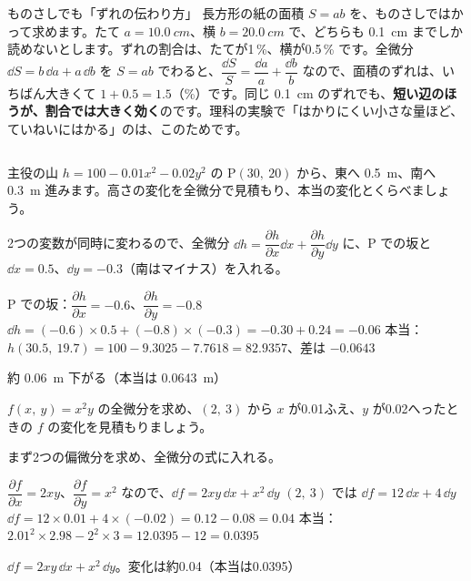 
\begin{column}{ものさしでも「ずれの伝わり方」}
長方形の紙の面積 $S=ab$ を、ものさしではかって求めます。たて $a=\qty{10.0}{cm}$、横 $b=\qty{20.0}{cm}$ で、どちらも \qty{0.1}{cm} までしか読めないとします。ずれの割合は、たてが1\,\%、横が0.5\,\% です。全微分 $\dd S=b\,\dd a+a\,\dd b$ を $S=ab$ でわると、$\dfrac{\dd S}{S}=\dfrac{\dd a}{a}+\dfrac{\dd b}{b}$ なので、面積のずれは、いちばん大きくて $1+0.5=1.5$（\%）です。同じ \qty{0.1}{cm} のずれでも、\textbf{短い辺のほうが、割合では大きく効く}のです。理科の実験で「はかりにくい小さな量ほど、ていねいにはかる」のは、このためです。
\end{column}


\begin{reidai}
主役の山 $h=100-0.01x^2-0.02y^2$ の P$(30,\ 20)$ から、東へ \qty{0.5}{m}、南へ \qty{0.3}{m} 進みます。高さの変化を全微分で見積もり、本当の変化とくらべましょう。\par
\kangaekata 2つの変数が同時に変わるので、全微分 $\dd h=\dfrac{\partial h}{\partial x}\dd x+\dfrac{\partial h}{\partial y}\dd y$ に、P での坂と $\dd x=0.5$、$\dd y=-0.3$（南はマイナス）を入れる。\par
\shiki P での坂：$\dfrac{\partial h}{\partial x}=-0.6$、$\dfrac{\partial h}{\partial y}=-0.8$\kviiidq
$\dd h=(-0.6)\times0.5+(-0.8)\times(-0.3)=-0.30+0.24=-0.06$\kviiidq
本当：$h(30.5,\ 19.7)=100-9.3025-7.7618=82.9357$、差は $-0.0643$\par
\kotae 約 \qty{0.06}{m} 下がる（本当は \qty{0.0643}{m}）
\end{reidai}

\begin{reidai}[全微分の式を作って使う]
$f(x,\ y)=x^2y$ の全微分を求め、$(2,\ 3)$ から $x$ が0.01ふえ、$y$ が0.02へったときの $f$ の変化を見積もりましょう。\par
\kangaekata まず2つの偏微分を求め、全微分の式に入れる。\par
\shiki $\dfrac{\partial f}{\partial x}=2xy$、$\dfrac{\partial f}{\partial y}=x^2$ なので、$\dd f=2xy\,\dd x+x^2\,\dd y$\kviiidq
$(2,\ 3)$ では $\dd f=12\,\dd x+4\,\dd y$\kviiidq
$\dd f=12\times0.01+4\times(-0.02)=0.12-0.08=0.04$\kviiidq
本当：$2.01^2\times2.98-2^2\times3=12.0395-12=0.0395$\par
\kotae $\dd f=2xy\,\dd x+x^2\,\dd y$。変化は約0.04（本当は0.0395）
\end{reidai}

